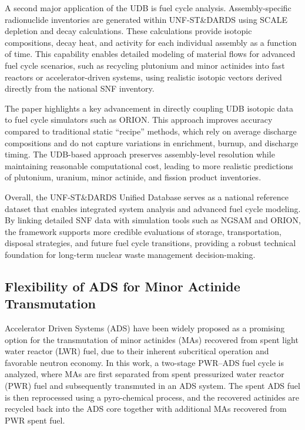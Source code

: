 A second major application of the UDB is fuel cycle analysis. Assembly-specific radionuclide inventories are generated within 
UNF-ST\&DARDS using SCALE depletion and decay calculations. These calculations provide isotopic compositions, decay heat, 
and activity for each individual assembly as a function of time. This capability enables detailed modeling of material flows 
for advanced fuel cycle scenarios, such as recycling plutonium and minor actinides into fast reactors or accelerator-driven systems, 
using realistic isotopic vectors derived directly from the national SNF inventory.

The paper highlights a key advancement in directly coupling UDB isotopic data to fuel cycle simulators such as ORION. 
This approach improves accuracy compared to traditional static ``recipe'' methods, which rely on average discharge compositions 
and do not capture variations in enrichment, burnup, and discharge timing. The UDB-based approach preserves assembly-level 
resolution while maintaining reasonable computational cost, leading to more realistic predictions of plutonium, uranium, 
minor actinide, and fission product inventories.

Overall, the UNF-ST\&DARDS Unified Database serves as a national reference dataset that enables integrated system analysis 
and advanced fuel cycle modeling. By linking detailed SNF data with simulation tools such as NGSAM and ORION, the framework 
supports more credible evaluations of storage, transportation, disposal strategies, and future fuel cycle transitions, 
providing a robust technical foundation for long-term nuclear waste management decision-making.

\subsection{Flexibility of ADS for Minor Actinide Transmutation}

Accelerator Driven Systems (ADS) have been widely proposed as a promising option for the transmutation of minor actinides (MAs) 
recovered from spent light water reactor (LWR) fuel, due to their inherent subcritical operation and favorable neutron economy. 
In this work, a two-stage PWR--ADS fuel cycle is analyzed, where MAs are first separated from spent pressurized water reactor (PWR) 
fuel and subsequently transmuted in an ADS system. The spent ADS fuel is then reprocessed using a pyro-chemical process, and the 
recovered actinides are recycled back into the ADS core together with additional MAs recovered from PWR spent fuel.

